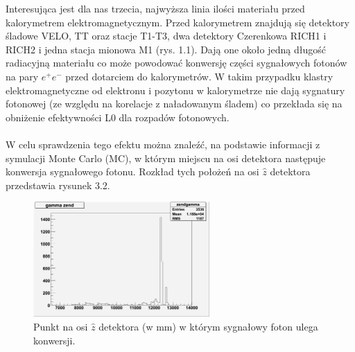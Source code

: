 \documentclass{pracamgr}
\begin{document}
\noindent
Interesująca jest dla nas trzecia, najwyższa linia ilości materiału przed kalorymetrem elektromagnetycznym. Przed kalorymetrem znajdują się detektory śladowe VELO, TT oraz stacje T1-T3, dwa detektory Czerenkowa RICH1 i RICH2 i jedna stacja mionowa M1 (rys. 1.1). Dają one około jedną długość radiacyjną materiału co może powodować konwersję części sygnałowych fotonów na pary $e^{+}e^{-}$ przed dotarciem do kalorymetrów. W takim przypadku klastry elektromagnetyczne od elektronu i pozytonu w kalorymetrze nie dają sygnatury fotonowej (ze względu na korelacje z naładowanym śladem) co przekłada się na obniżenie efektywności L0 dla rozpadów fotonowych.
\\\\
\noindent
W celu sprawdzenia tego efektu można znaleźć, na podstawie informacji z symulacji Monte Carlo (MC), w którym miejscu na osi detektora następuje konwersja sygnałowego fotonu. Rozkład tych położeń na osi $\hat{z}$ detektora przedstawia rysunek 3.2.

\begin{figure}[!h]
 \centering
 \includegraphics[width=0.6\textwidth]{rysunki/zend.png}
 \caption{Punkt na osi $\hat{z}$ detektora (w mm) w którym sygnałowy foton ulega konwersji.}
\end{figure}
 
\end{document}
